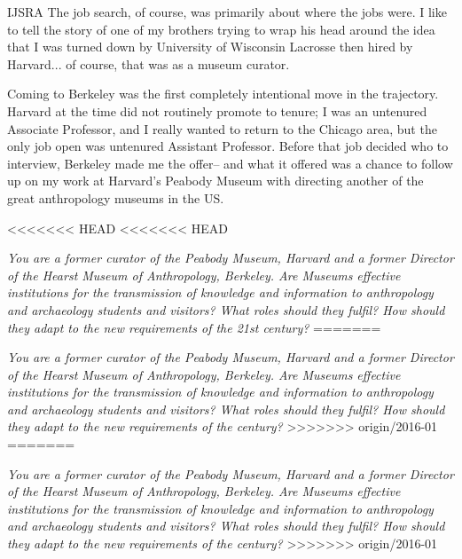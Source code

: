 \begin{labeling}{IJSRA}
The job search, of course, was primarily about where the jobs were. I like to tell the story of one of my brothers trying to wrap his head around the idea that I was turned down by University of Wisconsin Lacrosse then hired by Harvard... of course, that was as a museum curator. 

Coming to Berkeley was the first completely intentional move in the trajectory. Harvard at the time did not routinely promote to tenure; I was an untenured Associate Professor, and I really wanted to return to the Chicago area, but the only job open was untenured Assistant Professor. Before that job decided who to interview, Berkeley made me the offer-- and what it offered was a chance to follow up on my work at Harvard's Peabody Museum with directing another of the great anthropology museums in the US.
	
<<<<<<< HEAD
<<<<<<< HEAD
\item[IJSRA] \emph{You are a former curator of the Peabody Museum, Harvard and a former Director of the Hearst Museum of Anthropology, Berkeley. Are Museums effective institutions for the transmission of knowledge and information to anthropology and archaeology students and visitors? What roles should they fulfil? How should they adapt to the new requirements of the 21st century?}
=======
\item[IJSRA] \textit{You are a former curator of the Peabody Museum, Harvard and a former Director of the Hearst Museum of Anthropology, Berkeley. Are Museums effective institutions for the transmission of knowledge and information to anthropology and archaeology students and visitors? What roles should they fulfil? How should they adapt to the new requirements of the  century?}
>>>>>>> origin/2016-01
=======
\item[IJSRA] \textit{You are a former curator of the Peabody Museum, Harvard and a former Director of the Hearst Museum of Anthropology, Berkeley. Are Museums effective institutions for the transmission of knowledge and information to anthropology and archaeology students and visitors? What roles should they fulfil? How should they adapt to the new requirements of the  century?}
>>>>>>> origin/2016-01


\end{labeling}
